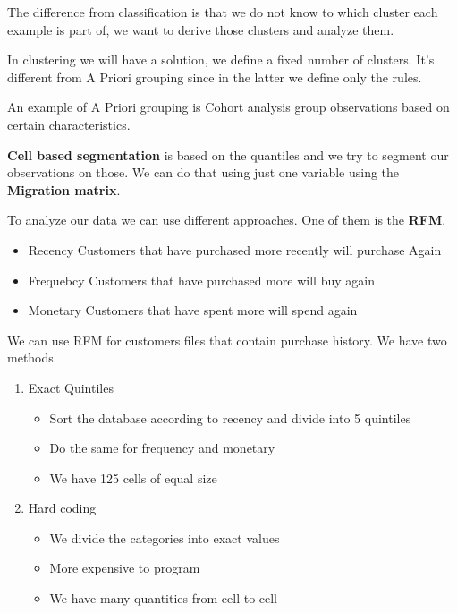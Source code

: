 The difference from classification is that we do not know to which cluster each example is part of, we want to derive those clusters and analyze them.

In clustering we will have a solution, we define a fixed number of clusters. It's different from A Priori grouping since in the latter we define only the rules.

\vspace{10pt}

An example of A Priori grouping is Cohort analysis \ra group observations based on certain characteristics. 

\vspace{10pt}

\textbf{Cell based segmentation} is based on the quantiles and we try to segment our observations on those. 
We can do that using just one variable using the \textbf{Migration matrix}.

\vspace{10pt}

To analyze our data we can use different approaches. One of them is the \textbf{RFM}.
\begin{itemize}
    \item Recency \ra Customers that have purchased more recently will purchase Again
    \item Frequebcy \ra Customers that have purchased more will buy again
    \item Monetary \ra Customers that have spent more will spend again
\end{itemize}

We can use RFM for customers files that contain purchase history. We have two methods

\begin{enumerate}
    \item Exact Quintiles
    \begin{itemize}
        \item Sort the database according to recency and divide into 5 quintiles
        \item Do the same for frequency and monetary
        \item We have 125 cells of equal size
    \end{itemize}
    \item Hard coding
    \begin{itemize}
        \item We divide the categories into exact values
        \item More expensive to program 
        \item We have many quantities from cell to cell
    \end{itemize}
\end{enumerate}

